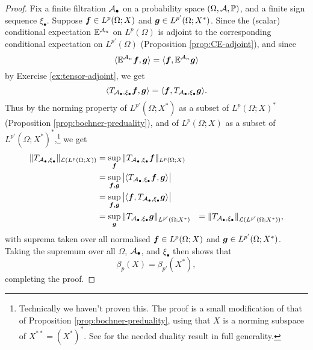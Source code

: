 \begin{proof}
  Fix a finite filtration $\mathcal{A}_{\bullet}$ on a probability space $(\Omega,\mathcal{A},\mathbb{P})$, and a finite sign sequence $\xi_{\bullet}$.
  Suppose $\bm{f} \in L^{p}(\Omega;X)$ and $\bm{g} \in L^{p'}(\Omega;X^{*})$.
  Since the (scalar) conditional expectation $\mathbb{E}^{\mathcal{A}_{n}}$ on $L^p(\Omega)$ is adjoint to the corresponding conditional expectation on $L^{p'}(\Omega)$ (Proposition \ref{prop:CE-adjoint}), and since
  \begin{equation*}
    \langle \mathbb{E}^{\mathcal{A}_{n}} \bm{f}, \bm{g} \rangle = \langle \bm{f}, \mathbb{E}^{\mathcal{A}_{n}} \bm{g} \rangle 
  \end{equation*}
  by Exercise \ref{ex:tensor-adjoint}, we get
  \begin{equation*}
    \langle T_{\mathcal{A}_{\bullet}, \xi_{\bullet}} \bm{f}, \bm{g} \rangle =  \langle \bm{f}, T_{\mathcal{A}_{\bullet}, \xi_{\bullet}} \bm{g} \rangle.
  \end{equation*}
  Thus by the norming property of $L^{p'}(\Omega;X^{*})$ as a subset of $L^{p}(\Omega;X)^{*}$ (Proposition \ref{prop:bochner-preduality}), and of $L^{p}(\Omega;X)$ as a subset of $L^{p'}(\Omega;X^{*})^{*}$,\footnote{Technically we haven't proven this. The proof is a small modification of that of Proposition \ref{prop:bochner-preduality}, using that $X$ is a norming subspace of $X^{**} = (X^{*})^{*}$. See \cite[Proposition 1.3.1]{HNVW16} for the needed duality result in full generality.}  we get
  \begin{equation*}
    \begin{aligned}
      \|T_{\mathcal{A}_{\bullet}, \xi_{\bullet}}\|_{\mathcal{L}(L^{p}(\Omega;X))}
      &= \sup_{\bm{f}} \| T_{\mathcal{A}_{\bullet}, \xi_{\bullet}} \bm{f} \|_{L^{p}(\Omega;X)} \\
      &= \sup_{\bm{f}, \bm{g}} \big| \langle T_{\mathcal{A}_{\bullet}, \xi_{\bullet}} \bm{f}, \bm{g} \rangle \big| \\
      &= \sup_{\bm{f}, \bm{g}} \big| \langle  \bm{f}, T_{\mathcal{A}_{\bullet}, \xi_{\bullet}} \bm{g} \rangle \big| \\
      &= \sup_{\bm{g}} \| T_{\mathcal{A}_{\bullet}, \xi_{\bullet}} \bm{g} \|_{L^{p'}(\Omega;X^{*})}
      &= \|T_{\mathcal{A}_{\bullet}, \xi_{\bullet}}\|_{\mathcal{L}(L^{p'}(\Omega;X^{*}))},
  \end{aligned}
\end{equation*}
with suprema taken over all normalised $\bm{f} \in L^{p}(\Omega;X)$ and $\bm{g} \in L^{p'}(\Omega;X^{*})$.
Taking the supremum over all $\Omega$, $\mathcal{A}_{\bullet}$, and $\xi_{\bullet}$ then shows that
\begin{equation*}
  \beta_{p}(X) = \beta_{p'}(X^{*}), 
\end{equation*}
completing the proof.
\end{proof}

